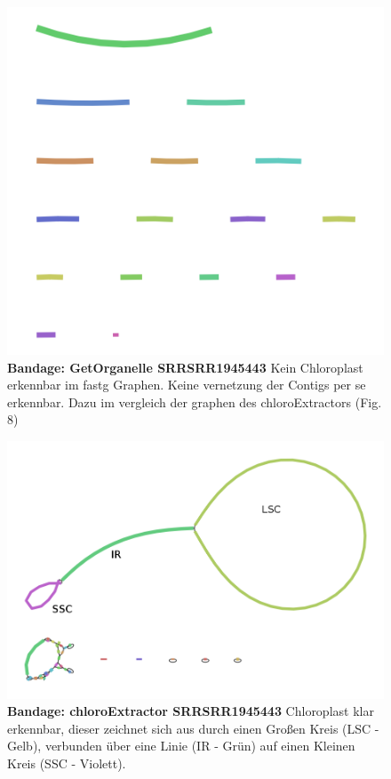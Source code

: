 \documentclass{scrartcl}
\begin{document}
\begin{figure}
\includegraphics[width=.9\linewidth]{./graph_GO_SRR1945443.png}
\caption[Bandage: GetOrganelle SRRSRR1945443]{\textbf{Bandage: GetOrganelle SRRSRR1945443} Kein Chloroplast erkennbar im fastg Graphen. Keine vernetzung der Contigs per se erkennbar. Dazu im vergleich der graphen des chloroExtractors (Fig. 8)}
\end{figure}
\begin{figure}
\includegraphics[width=.9\linewidth]{./graph_CE_SRR1945443_1.png}
\caption[Bandage: chloroExtractor SRRSRR1945443]{\textbf{Bandage: chloroExtractor SRRSRR1945443} Chloroplast klar erkennbar, dieser zeichnet sich aus durch einen Großen Kreis (LSC - Gelb), verbunden über eine Linie (IR - Grün) auf einen Kleinen Kreis (SSC - Violett). }
\end{figure}
\end{document}
